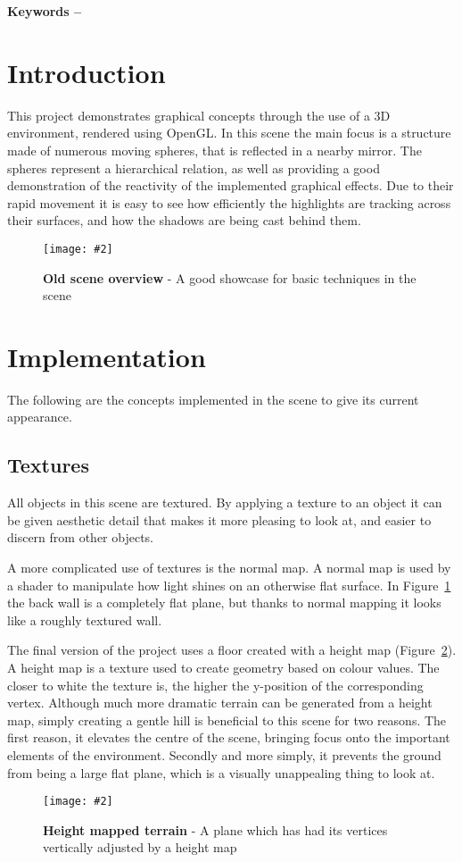 \documentclass[10pt, a4paper]{article}
\title{\mytitle}
\author{\myauthor\hspace{1em}\\\contact\\Edinburgh Napier University\hspace{0.5em}-\hspace{0.5em}\mymodule}
\date{}
\newcommand{\figuremacro}[5]{
    \begin{figure}[#1]
        \centering
        \texttt{[image: \#2]}
        \caption[#3]{\textbf{#3}#4}
        \label{fig:#2}
    \end{figure}
}
\begin{document}
	\maketitle
	\begin{abstract}
		This is a project which demonstrates the implementation of basic lighting, shadowing, and texturing effects, in a 3D graphical scene.
	\end{abstract}
    
	\textbf{Keywords -- }{\mykeywords}
	\section{Introduction}
	This project demonstrates graphical concepts through the use of a 3D environment, rendered using OpenGL.  In this scene the main focus is a structure made of numerous moving spheres, that is reflected in a nearby mirror.  The spheres represent a hierarchical relation, as well as providing a good demonstration of the reactivity of the implemented graphical effects.  Due to their rapid movement it is easy to see how efficiently the highlights are tracking across their surfaces, and how the shadows are being cast behind them.
    
    \figuremacro{h}{basic_scene}{Old scene overview}{ - A good showcase for basic techniques in the scene}{1.0}
	
	\section{Implementation}
	The following are the concepts implemented in the scene to give its current appearance.
	
	\subsection{Textures}
	All objects in this scene are textured.  By applying a texture to an object it can be given aesthetic detail that makes it more pleasing to look at, and easier to discern from other objects.
	
	A more complicated use of textures is the normal map.  A normal map is used by a shader to manipulate how light shines on an otherwise flat surface.  In Figure~\ref{fig:basic_scene} the back wall is a completely flat plane, but thanks to normal mapping it looks like a roughly textured wall.
	
	The final version of the project uses a floor created with a height map (Figure~\ref{fig:terrain}).  A height map is a texture used to create geometry based on colour values.  The closer to white the texture is, the higher the y-position of the corresponding vertex.  Although much more dramatic terrain can be generated from a height map, simply creating a gentle hill is beneficial to this scene for two reasons.  The first reason, it elevates the centre of the scene, bringing focus onto the important elements of the environment.  Secondly and more simply, it prevents the ground from being a large flat plane, which is a visually unappealing thing to look at.
	\figuremacro{h}{terrain}{Height mapped terrain}{ - A plane which has had its vertices vertically adjusted by a height map}{1.0}
	
\end{document}
